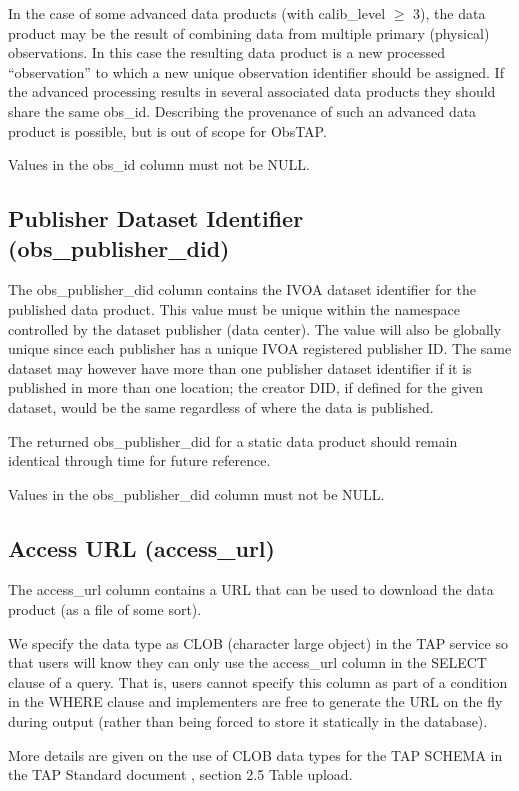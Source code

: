 \documentclass[11pt,a4paper]{ivoa}
\begin{document}
In the case of some advanced data products (with calib\_level ${\geq}$ 3), the data product may be the result of
combining data from multiple primary (physical) observations.  In this case the resulting data product is a new
processed ``observation'' to which a new unique observation identifier should be assigned.  If the advanced processing
results in several associated data products they should share the same obs\_id.  Describing the provenance of such an
advanced data product is possible, but is out of scope for ObsTAP.

Values in the obs\_id column must not be NULL.

\subsection{Publisher Dataset Identifier (obs\_publisher\_did)}
The obs\_publisher\_did column contains the IVOA dataset identifier \citep{2007ivoa.spec.0314P} for the published data
product.  This value must be unique within the namespace controlled by the dataset publisher (data center).  The value
will also be globally unique since each publisher has a unique IVOA registered publisher ID.  The same dataset may
however have more than one publisher dataset identifier if it is published in more than one location; the creator DID,
if defined for the given dataset, would be the same regardless of where the data is published.

The returned obs\_publisher\_did for a static data product should remain identical through time for future reference.

Values in the obs\_publisher\_did column must not be NULL.

\subsection{Access URL (access\_url)}
The access\_url column contains a URL that can be used to download the data product (as a file of some sort).

We specify the data type as CLOB (character large object) in the TAP service so that users will know they can only use
the access\_url column in the SELECT clause of a query.  That is, users cannot specify this column as part of a
condition in the WHERE clause and implementers are free to generate the URL on the fly during output (rather than being
forced to store it statically in the database).

More details are given on the use of CLOB data types for the TAP SCHEMA in the TAP Standard document
\citep{2010ivoa.spec.0327D}, section 2.5 Table upload.
\end{document}
